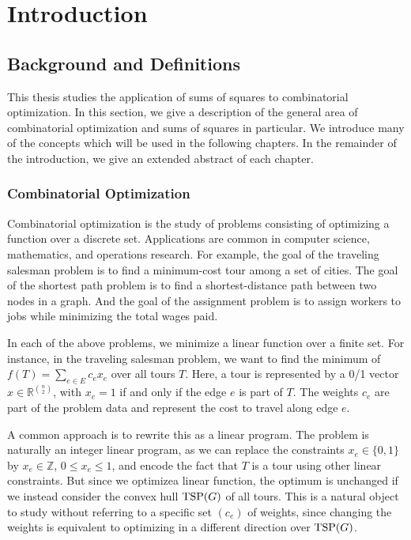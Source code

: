 


\chapter{Introduction}
\label{chap:Introduction}

\section{Background and Definitions}
This thesis studies the application of sums of squares to combinatorial optimization. 
In this section, we give a description of the general area of combinatorial optimization and sums of squares in particular.
We introduce many of the concepts which will be used in the following chapters. 
In the remainder of the introduction, we give an extended abstract of each chapter.

\subsection{Combinatorial Optimization}
Combinatorial optimization is the study of problems consisting of optimizing a function over a discrete set. 
Applications are common in computer science, mathematics, and operations research.
For example, the goal of the traveling salesman problem is to find a minimum-cost tour among a set of cities.
The goal of the shortest path problem is to find a shortest-distance path between two nodes in a graph.
And the goal of the assignment problem is to assign workers to jobs while minimizing the total wages paid. 

In each of the above problems, we minimize a linear function over a finite set.
For instance, in the traveling salesman problem, we want to find the minimum of $f(T) = \sum_{e \in E} c_ex_e$ over all tours $T$.
Here, a tour is represented by a 0/1 vector $x \in \mathbb{R}^{n \choose 2}$, with $x_e = 1$ if and only if the edge $e$ is part of $T$.
The weights $c_e$ are part of the problem data and represent the cost to travel along edge $e$.

A common approach is to rewrite this as a linear program. 
The problem is naturally an integer linear program, as we can replace the constraints $x_e \in \{0,1\}$ by $x_e \in \mathbb{Z}$, $0 \le x_e \le 1$, and encode the fact that $T$ is a tour using other linear constraints.
But since we optimizea linear function, the optimum is unchanged if we instead consider the convex hull $\textup{TSP}(G)$ of all tours.
This is a natural object to study without referring to a specific set $(c_e)$ of weights, since changing the weights is equivalent to optimizing in a different direction over $\textup{TSP}(G)$.

